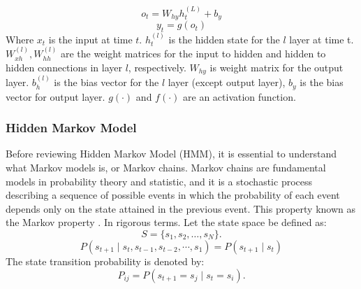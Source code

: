 \documentclass[12pt,a4paper]{article}
\begin{document}
\begin{equation}
    o_t = W_{hy}h^{(L)}_{t} + b_y
\end{equation}
\begin{equation}
    y_t = g(o_t)
\end{equation}
Where $x_t$ is the input at time $t$. $h^{(l)}_{t}$ is the hidden state for the $l$ layer at time t. $W^{(l)}_{xh}, W^{(l)}_{hh}$ are the weight matrices for the input to hidden and hidden to hidden connections in layer $l$, respectively. $W_{hy}$ is weight matrix for the output layer. $b^{(l)}_h$ is the bias vector for the $l$ layer (except output layer), $b_y$ is the bias vector for output layer. $g(\cdot)$ and $f(\cdot)$ are an activation function. 

\newpage
\subsubsection{Hidden Markov Model}
Before reviewing Hidden Markov Model (HMM), it is essential to understand what Markov models is, or Markov chains. Markov chains are fundamental models in probability theory and statistic, and it is a stochastic process describing a sequence of possible events in which the probability of each event depends only on the state attained in the previous event. This property known as the Markov property \parencite{roberts2004general, rabiner1986anintroduction}. In rigorous terms. Let the state space be defined as:
\begin{equation}
    S = \{ s_1, s_2, \dots, s_N \}.
\end{equation}
\begin{equation}
    P(s_{t+1} \mid s_t, s_{t-1}, s_{t-2}, \cdots, s_{1}) = P(s_{t+1} \mid s_t)
\end{equation}
The state transition probability is denoted by:
\begin{equation}
    P_{ij} = P(s_{t+1} = s_j \mid s_t = s_i).
\end{equation}
\end{document}
